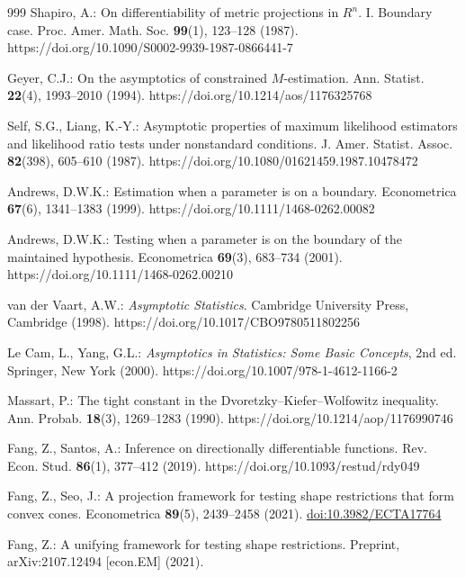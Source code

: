 \begin{thebibliography}{999}
Shapiro, A.: On differentiability of metric projections in \(R^n\). I. Boundary case. Proc. Amer. Math. Soc. \textbf{99}(1), 123--128 (1987). https://doi.org/10.1090/S0002-9939-1987-0866441-7

Geyer, C.J.: On the asymptotics of constrained \(M\)-estimation. Ann. Statist. \textbf{22}(4), 1993--2010 (1994). https://doi.org/10.1214/aos/1176325768

Self, S.G., Liang, K.-Y.: Asymptotic properties of maximum likelihood estimators and likelihood ratio tests under nonstandard conditions. J. Amer. Statist. Assoc. \textbf{82}(398), 605--610 (1987). https://doi.org/10.1080/01621459.1987.10478472

Andrews, D.W.K.: Estimation when a parameter is on a boundary. Econometrica
\textbf{67}(6), 1341--1383 (1999).
https://doi.org/10.1111/1468-0262.00082

Andrews, D.W.K.: Testing when a parameter is on the boundary of the maintained
hypothesis. Econometrica \textbf{69}(3), 683--734 (2001).
https://doi.org/10.1111/1468-0262.00210

van der Vaart, A.W.: \emph{Asymptotic Statistics}. Cambridge University
Press, Cambridge (1998). https://doi.org/10.1017/CBO9780511802256

Le Cam, L., Yang, G.L.: \emph{Asymptotics in Statistics: Some Basic
Concepts}, 2nd ed. Springer, New York (2000).
https://doi.org/10.1007/978-1-4612-1166-2

Massart, P.: The tight constant in the Dvoretzky--Kiefer--Wolfowitz inequality. Ann. Probab. \textbf{18}(3), 1269--1283 (1990). https://doi.org/10.1214/aop/1176990746

Fang, Z., Santos, A.: Inference on directionally differentiable functions. Rev. Econ. Stud. \textbf{86}(1), 377--412 (2019). https://doi.org/10.1093/restud/rdy049

Fang, Z., Seo, J.: A projection framework for testing shape restrictions that
form convex cones. Econometrica \textbf{89}(5), 2439--2458 (2021).
\href{https://doi.org/10.3982/ECTA17764}{doi:10.3982/ECTA17764}

Fang, Z.: A unifying framework for testing shape restrictions. Preprint,
arXiv:2107.12494 [econ.EM] (2021).


\end{thebibliography}

